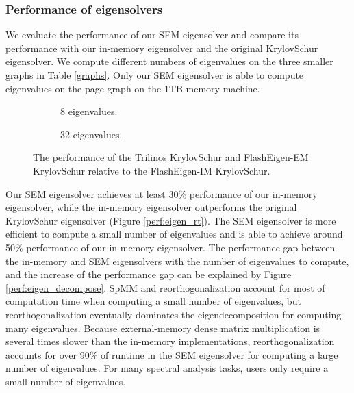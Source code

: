 \subsubsection{Performance of eigensolvers}

We evaluate the performance of our SEM eigensolver and compare its performance
with our in-memory eigensolver and the original KrylovSchur eigensolver.
We compute different numbers of eigenvalues on the three smaller graphs in
Table \ref{graphs}. Only our SEM eigensolver is able to compute eigenvalues
on the page graph on the 1TB-memory machine.

\begin{figure}[t]
\centering
\footnotesize
\begin{subfigure}{.5\linewidth}
	
	\caption{8 eigenvalues.}
	\label{fig:eigen8}
\end{subfigure}%
\begin{subfigure}{.5\linewidth}
	
	\caption{32 eigenvalues.}
	\label{fig:eigen32}
\end{subfigure}
\caption{The performance of the Trilinos KrylovSchur and FlashEigen-EM
KrylovSchur relative to the FlashEigen-IM KrylovSchur.}
\label{fig:eigen}
\end{figure}

Our SEM eigensolver achieves at least 30\% performance of our in-memory
eigensolver, while the in-memory eigensolver outperforms the original
KrylovSchur eigensolver (Figure \ref{perf:eigen_rt}). The SEM eigensolver
is more efficient to compute a small number of eigenvalues and is able
to achieve around 50\% performance of our in-memory eigensolver.
The performance gap between the in-memory and SEM eigensolvers with the number
of eigenvalues to compute, and the increase of the performance gap can be
explained by Figure \ref{perf:eigen_decompose}. SpMM and reorthogonalization
account for most of computation time when computing a small number of eigenvalues,
but reorthogonalization eventually dominates the eigendecomposition for computing
many eigenvalues. Because external-memory dense matrix multiplication is several
times slower than the in-memory implementations, reorthogonalization accounts for
over 90\% of runtime in the SEM eigensolver for computing a large number of
eigenvalues. For many spectral analysis tasks, users only require a small number
of eigenvalues.

%		

